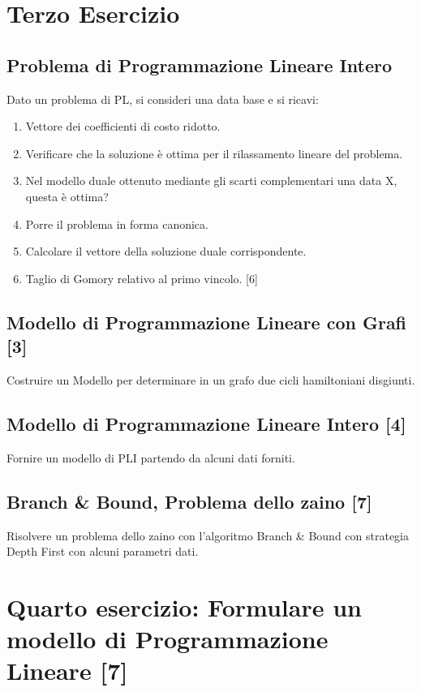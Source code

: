 \documentclass[\main/main.tex]{subfiles}
\begin{document}
\section{Terzo Esercizio}

\subsection{Problema di Programmazione Lineare Intero}
Dato un problema di PL, si consideri una data base e si ricavi:

\begin{enumerate}
  \item Vettore dei coefficienti di costo ridotto.
  \item Verificare che la soluzione è ottima per il rilassamento lineare del problema.
  \item Nel modello duale ottenuto mediante gli scarti complementari una data X, questa è ottima?
  \item Porre il problema in forma canonica.
  \item Calcolare il vettore della soluzione duale corrispondente.
  \item Taglio di Gomory relativo al primo vincolo. [6]
\end{enumerate}

\subsection{Modello di Programmazione Lineare con Grafi [3]}
Costruire un Modello per determinare in un grafo due cicli hamiltoniani disgiunti.

\subsection{Modello di Programmazione Lineare Intero [4]}
Fornire un modello di PLI partendo da alcuni dati forniti.

\subsection{Branch \& Bound, Problema dello zaino [7]}
Risolvere un problema dello zaino con l'algoritmo Branch \& Bound con strategia Depth First con alcuni parametri dati.

\section{Quarto esercizio: Formulare un modello di Programmazione Lineare [7]}
\end{document}

